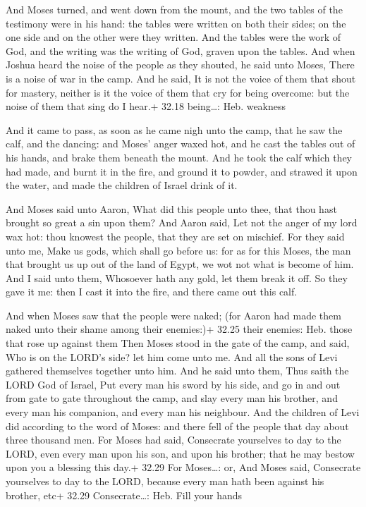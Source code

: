  And Moses turned, and went down from the mount, and the
two tables of the testimony were in his hand: the tables were written on
both their sides; on the one side and on the other were they written.
 And the tables were the work of God, and the writing was
the writing of God, graven upon the tables.  And when
Joshua heard the noise of the people as they shouted, he said unto
Moses, There is a noise of war in the camp.  And he said,
It is not the voice of them that shout for mastery, neither is it the
voice of them that cry for being overcome: but the noise of them that
sing do I hear.+ 32.18 being\ldots: Heb. weakness

 And it came to pass, as soon as he came nigh unto the
camp, that he saw the calf, and the dancing: and Moses' anger waxed hot,
and he cast the tables out of his hands, and brake them beneath the
mount.  And he took the calf which they had made, and burnt
it in the fire, and ground it to powder, and strawed it upon the water,
and made the children of Israel drink of it.

 And Moses said unto Aaron, What did this people unto thee,
that thou hast brought so great a sin upon them?  And Aaron
said, Let not the anger of my lord wax hot: thou knowest the people,
that they are set on mischief.  For they said unto me, Make
us gods, which shall go before us: for as for this Moses, the man that
brought us up out of the land of Egypt, we wot not what is become of
him.  And I said unto them, Whosoever hath any gold, let
them break it off. So they gave it me: then I cast it into the fire, and
there came out this calf.

 And when Moses saw that the people were naked; (for
Aaron had made them naked unto their shame among their enemies:)+ 32.25
their enemies: Heb. those that rose up against them  Then
Moses stood in the gate of the camp, and said, Who is on the LORD's
side? let him come unto me. And all the sons of Levi gathered themselves
together unto him.  And he said unto them, Thus saith the
LORD God of Israel, Put every man his sword by his side, and go in and
out from gate to gate throughout the camp, and slay every man his
brother, and every man his companion, and every man his neighbour.
 And the children of Levi did according to the word of
Moses: and there fell of the people that day about three thousand men.
 For Moses had said, Consecrate yourselves to day to the
LORD, even every man upon his son, and upon his brother; that he may
bestow upon you a blessing this day.+ 32.29 For Moses\ldots: or, And
Moses said, Consecrate yourselves to day to the LORD, because every man
hath been against his brother, etc+ 32.29 Consecrate\ldots: Heb. Fill
your hands

